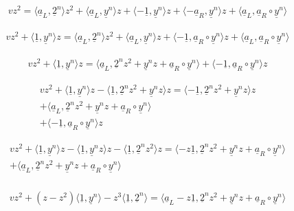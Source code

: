\begin{appendices}
\begin{align*}
vz^2 = \langle\underline{a}_L, \underline{2}^n\rangle z^2 + \langle\underline{a}_L, \underline{y}^n\rangle z + \langle - \underline{1}, \underline{y}^n\rangle z + \langle - \underline{a}_R, \underline{y}^n\rangle z + \langle\underline{a}_L, \underline{a}_R  \circ \underline{y}^n\rangle
\end{align*}

\begin{align*}
vz^2 + \langle \underline{1}, \underline{y}^n\rangle z = \langle\underline{a}_L, \underline{2}^n\rangle z^2 + \langle\underline{a}_L, \underline{y}^n\rangle z + \langle - \underline{1}, \underline{a}_R  \circ \underline{y}^n \rangle z + \langle\underline{a}_L, \underline{a}_R  \circ \underline{y}^n\rangle
\end{align*}

\begin{align*}
vz^2 + \langle \underline{1}, \underline{y}^n\rangle z = \langle\underline{a}_L, \underline{2}^n z^2 + \underline{y}^n z + \underline{a}_R \circ \underline{y}^n \rangle + \langle - \underline{1}, \underline{a}_R  \circ \underline{y}^n \rangle z
\end{align*}

\begin{align*}
vz^2 + \langle \underline{1}, \underline{y}^n\rangle z - \langle \underline{1}, \underline{2}^n z^2 + \underline{y}^n z \rangle z = \langle - \underline{1}, \underline{2}^n z^2 + \underline{y}^n z \rangle z\\ + \langle\underline{a}_L, \underline{2}^n z^2 + \underline{y}^n z + \underline{a}_R \circ \underline{y}^n \rangle\\ + \langle - \underline{1}, \underline{a}_R  \circ \underline{y}^n \rangle z
\end{align*}

\begin{align*}
vz^2 + \langle \underline{1}, \underline{y}^n\rangle z - \langle \underline{1}, \underline{y}^n z \rangle z - \langle \underline{1}, \underline{2}^n z^2 \rangle z = \langle - z\underline{1}, \underline{2}^n z^2 + \underline{y}^n z + \underline{a}_R \circ \underline{y}^n \rangle\\ + \langle\underline{a}_L, \underline{2}^n z^2 + \underline{y}^n z + \underline{a}_R \circ \underline{y}^n \rangle\\
\end{align*}

\begin{align*}
vz^2 + (z - z^2)\langle \underline{1}, \underline{y}^n \rangle - z^3 \langle \underline{1}, \underline{2}^n\rangle = \langle\underline{a}_L - z\underline{1}, \underline{2}^n z^2 + \underline{y}^n z + \underline{a}_R \circ \underline{y}^n \rangle
\end{align*}


\end{appendices}
